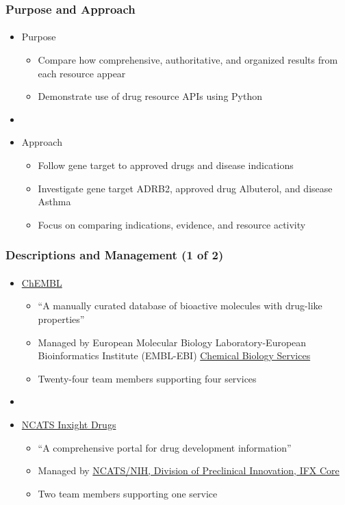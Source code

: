 \documentclass[aspectratio=169,xcolor=dvipsnames]{beamer}
\begin{document}
\begin{frame}
  \frametitle{Purpose and Approach}
  \framesubtitle{}
  \begin{itemize}
  \item[] Purpose
    \begin{itemize}
    \item Compare how comprehensive, authoritative, and organized
      results from each resource appear
    \item Demonstrate use of drug resource APIs using Python
    \end{itemize}
  \item[]
  \item[] Approach
    \begin{itemize}
    \item Follow gene target to approved drugs and disease indications
    \item Investigate gene target ADRB2, approved drug Albuterol, and
      disease Asthma
    \item Focus on comparing indications, evidence, and resource
      activity
    \end{itemize}
  \end{itemize}
\end{frame}

\begin{frame}
  \frametitle{Descriptions and Management (1 of 2)}
  \framesubtitle{}
  \begin{itemize}
  \item[] \href{https://www.ebi.ac.uk/chembl/}{ChEMBL}
    \begin{itemize}
    \item ``A manually curated database of bioactive molecules with
      drug-like properties''
    \item Managed by European Molecular Biology Laboratory-European
      Bioinformatics Institute (EMBL-EBI)
      \href{https://www.ebi.ac.uk/about/teams/chemical-biology-services/}{Chemical
        Biology Services}
    \item Twenty-four team members supporting four services
    \end{itemize}
  \item[]
  \item[] \href{https://drugs.ncats.io/}{NCATS Inxight Drugs}
    \begin{itemize}
    \item ``A comprehensive portal for drug development information''
    \item Managed by \href{https://drugs.ncats.io/about}{NCATS/NIH,
      Division of Preclinical Innovation, IFX Core}
    \item Two team members supporting one service
    \end{itemize}
  \end{itemize}
\end{frame}
\end{document}
